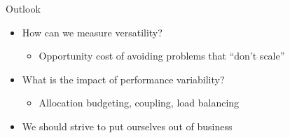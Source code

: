\documentclass{beamer}
\begin{document}
\begin{frame}{Outlook}
  \begin{itemize}
  \item How can we measure versatility?
    \begin{itemize}
    \item Opportunity cost of avoiding problems that ``don't scale''
    \end{itemize}
  \item What is the impact of performance variability?
    \begin{itemize}
    \item Allocation budgeting, coupling, load balancing
    \end{itemize}
  \item We should strive to put ourselves out of business
  \end{itemize}
\end{frame}
\end{document}
